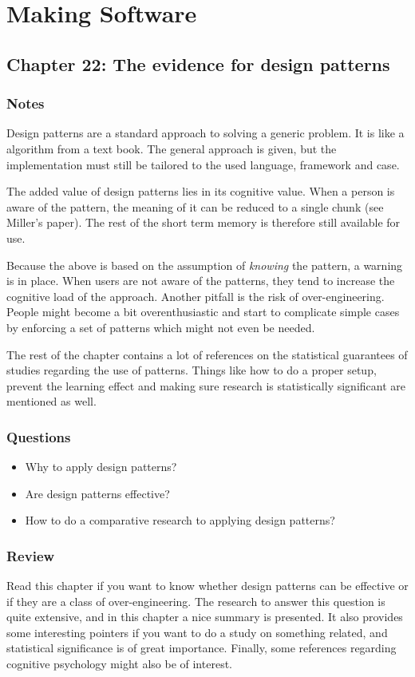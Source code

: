 \chapter{Making Software \cite{makingsoftware}}
\section{Chapter 22: The evidence for design patterns}
\subsection{Notes}
Design patterns are a standard approach to solving a generic problem. 
It is like a algorithm from a text book. 
The general approach is given, but the implementation must still be tailored to the used language, framework and case. 

The added value of design patterns lies in its cognitive value. 
When a person is aware of the pattern, the meaning of it can be reduced to a single chunk (see Miller's paper). 
The rest of the short term memory is therefore still available for use.

Because the above is based on the assumption of \emph{knowing} the pattern, a warning is in place. 
When users are not aware of the patterns, they tend to increase the cognitive load of the approach. 
Another pitfall is the risk of over-engineering. 
People might become a bit overenthusiastic and start to complicate simple cases by enforcing a set of patterns which might not even be needed.

The rest of the chapter contains a lot of references on the statistical guarantees of studies regarding the use of patterns. 
Things like how to do a proper setup, prevent the learning effect and making sure research is statistically significant are mentioned as well.

\subsection{Questions}
\begin{itemize}
  \item Why to apply design patterns?
  \item Are design patterns effective?
  \item How to do a comparative research to applying design patterns?
\end{itemize}

\subsection{Review}
Read this chapter if you want to know whether design patterns can be effective or if they are a class of over-engineering.
The research to answer this question is quite extensive, and in this chapter a nice summary is presented. 
It also provides some interesting pointers if you want to do a study on something related, and statistical significance is of great importance.
Finally, some references regarding cognitive psychology might also be of interest.


